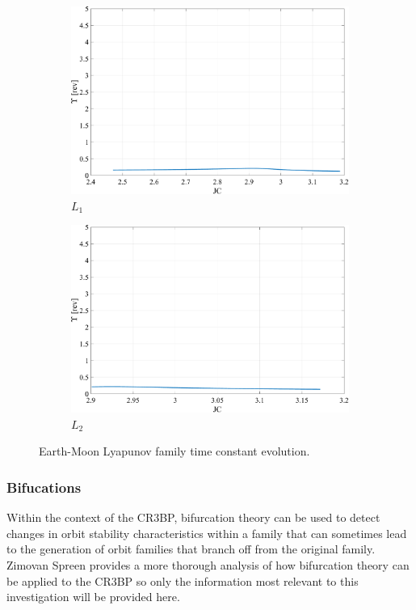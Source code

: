 \begin{figure}[ht]
    \begin{subfigure}[h]{0.4\linewidth}
        \includegraphics[width=\textwidth]{figures/L1LyapunovTimeConstant.pdf}
        \caption{$L_{1}$}
    \end{subfigure}
    \hfill
    \begin{subfigure}[h]{0.4\linewidth}
        \includegraphics[width=\textwidth]{figures/L2LyapunovTimeConstant.pdf}
        \caption{$L_{2}$}
    \end{subfigure}
    \caption{Earth-Moon Lyapunov family time constant evolution.}
    \label{fig:timeConstant}
\end{figure}

\subsubsection{Bifucations}
Within the context of the CR3BP, bifurcation theory can be used to detect changes in orbit
stability characteristics within a family that can sometimes lead to the generation of orbit
families that branch off from the original family. Zimovan Spreen provides a more thorough
analysis of how bifurcation theory can be applied to the CR3BP so only the information most
relevant to this investigation will be provided here\cite{ZimovanSpreen:2021}.

